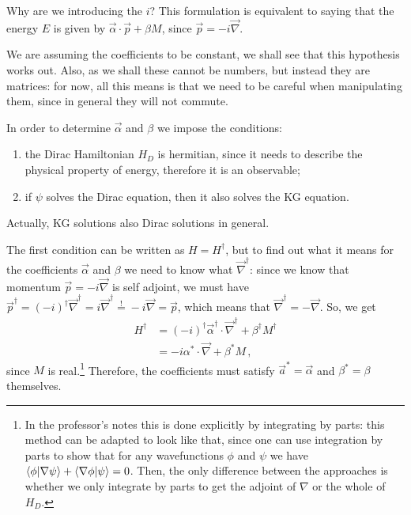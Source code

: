 \documentclass[main.tex]{subfiles}
\begin{document}
Why are we introducing the \(i\)? This formulation is equivalent to saying that the energy \(E\) is given by \(\vec{\alpha} \cdot \vec{p} + \beta M\), since \(\vec{p} = - i \vec{\nabla}\). 

We are assuming the coefficients to be constant, we shall see that this hypothesis works out. Also, as we shall these cannot be numbers, but instead they are matrices: for now, all this means is that we need to be careful when manipulating them, since in general they will not commute. 

In order to determine \(\vec{\alpha }\) and \(\beta \) we impose the conditions: 
\begin{enumerate}
  \item the Dirac Hamiltonian \(H_D\) is hermitian, since it needs to describe the physical property of energy, therefore it is an observable;
  \item if \(\psi \) solves the Dirac equation, then it also solves the KG equation. 
\end{enumerate}

Actually, KG solutions also Dirac solutions in general. 

The first condition can be written as \(H = H ^\dag\), but to find out what it means for the coefficients \(\vec{\alpha }\) and \(\beta \) we need to know what \(\vec{\nabla} ^\dag\): since we know that momentum \(\vec{p} = -i \vec{\nabla}\) is self adjoint, we must have \(\vec{p} ^\dag = (-i) ^\dag \vec{\nabla} ^\dag = i \vec{\nabla} ^\dag \overset{!}{=} -i \vec{\nabla} = \vec{p} \),
which means that \(\vec{\nabla} ^\dag = - \vec{\nabla}\).
So, we get 
%
\begin{subequations}
\begin{align}
H ^\dag &= (-i) ^\dag \vec{\alpha} ^\dag \cdot \vec{\nabla} ^\dag + \beta ^\dag M ^\dag  \\
&= -i \alpha^{*} \cdot \vec{\nabla} + \beta^{*} M
\,,
\end{align}
\end{subequations}
%
since \(M\) is real.\footnote{In the professor's notes this is done explicitly by integrating by parts: this method can be adapted to look like that, since one can use integration by parts to show that for any wavefunctions \(\phi \) and \(\psi \) we have \(\braket{\phi }{\nabla \psi } + \braket{\nabla \phi}{\psi } = 0\). Then, the only difference between the approaches is whether we only integrate by parts to get the adjoint of \(\nabla\) or the whole of \(H_D\). }
Therefore, the coefficients must satisfy \(\vec{a}^{*} = \vec{\alpha}\) and \(\beta^{*} = \beta \) themselves. 
\end{document}
